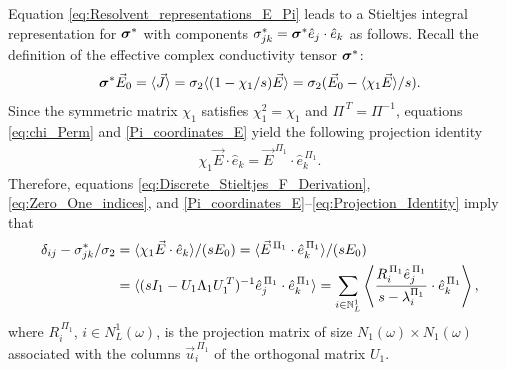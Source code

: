 \documentclass{cmslatex}
\newcommand\bsig{\mbox{\boldmath${\sigma}$}}
\begin{document}
Equation \eqref{eq:Resolvent_representations_E_Pi} leads to a
Stieltjes integral representation for $\bsig^*$ with components
$\sigma^*_{jk}=\bsig^*\hat{e}_j\cdot\hat{e}_k$ as follows. Recall the
definition of the effective complex conductivity tensor $\bsig^*$:
%
\begin{align}\label{eq:Eff_Cond_Tens_Def}
  \bsig^*\vec{E}_0=\langle\vec{J}\rangle 
                =\sigma_2\langle(1-\chi_1/s)\vec{E}\rangle
                =\sigma_2(\vec{E}_0 -\langle\chi_1\vec{E}\rangle/s).
\end{align}
%
Since the symmetric matrix $\chi_1$ satisfies $\chi_1^2=\chi_1$ and
$\Pi^{\,T}=\Pi^{-1}$, equations \eqref{eq:chi_Perm} and
\eqref{Pi_coordinates_E} yield the following projection identity  
%
\begin{align}\label{eq:Projection_Identity}
 \chi_1\vec{E}\cdot\hat{e}_k=\vec{E}^{\,\Pi_1}\cdot\hat{e}_k^{\,\Pi_1}.
\end{align}
%
Therefore, equations \eqref{eq:Discrete_Stieltjes_F_Derivation},
\eqref{eq:Zero_One_indices}, and
\eqref{Pi_coordinates_E}--\eqref{eq:Projection_Identity} 
imply that  
%
\begin{align}\label{eq:Disc_Stieltjes_Rep_Sigma}
  \delta_{ij}-\sigma^*_{jk}/\sigma_2&=\langle\chi_1\vec{E}\cdot\hat{e}_k\rangle/(sE_0)
          =\langle\vec{E}^{\,\Pi_1}\cdot\hat{e}_k^{\,\Pi_1}\rangle/(sE_0)
          \notag\\
          &=\langle(sI_1-U_1\Lambda_1U_1^{\,T})^{-1}\hat{e}_j^{\,\Pi_1}\cdot\hat{e}_k^{\,\Pi_1}\rangle          
          =\sum_{i\in\mathbb{N}_L^1}\left\langle
          \frac{R_i^{\,\Pi_1}\hat{e}_j^{\,\Pi_1}}{s-\lambda_i^{\Pi_1}}\cdot\hat{e}_k^{\,\Pi_1}
          \right\rangle,  
\end{align}
%
where $R_i^{\,\Pi_1}$, $i\in N_L^1(\omega)$, is the projection matrix of size
$N_1(\omega)\times N_1(\omega)$ associated with the columns $\vec{u}_i^{\,\Pi_1}$ of
the orthogonal matrix $U_1$. 
\end{document}
